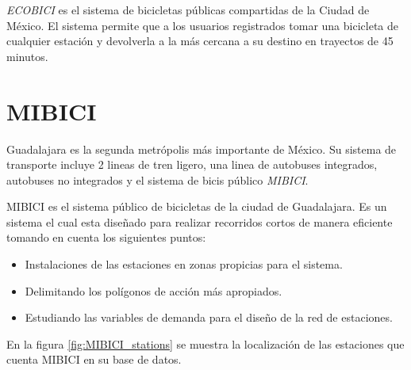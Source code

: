 \textit{ECOBICI} es el sistema de bicicletas públicas compartidas de la Ciudad de México. El sistema permite que a los usuarios registrados tomar una bicicleta de cualquier estación y devolverla a la más cercana a su destino en trayectos de 45 minutos.

\section{MIBICI}

Guadalajara es la segunda metrópolis más importante de México. Su sistema de transporte incluye 2 lineas de tren ligero, una linea de autobuses integrados, autobuses no integrados y el sistema de bicis público \textit{MIBICI}.

MIBICI es el sistema público de bicicletas de la ciudad de Guadalajara. Es un sistema el cual esta diseñado para realizar recorridos cortos de manera eficiente tomando en cuenta los siguientes puntos:

\begin{itemize}
    \item Instalaciones de las estaciones en zonas propicias para el sistema.
    \item Delimitando los polígonos de acción más apropiados.
    \item Estudiando las variables de demanda para el diseño de la red de estaciones.
\end{itemize}

En la figura \ref{fig:MIBICI_stations} se muestra la localización de las estaciones que cuenta MIBICI en su base de datos.

